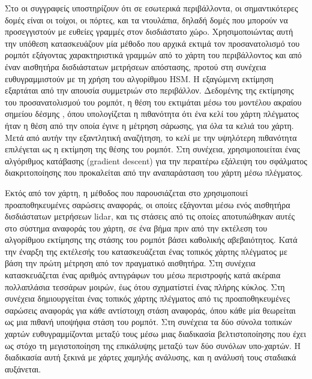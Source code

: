 Στο \cite{Zhu2011a} οι συγγραφείς υποστηρίζουν ότι σε εσωτερικά περιβάλλοντα,
οι σημαντικότερες δομές είναι οι τοίχοι, οι πόρτες, και τα ντουλάπια, δηλαδή
δομές που μπορούν να προσεγγιστούν με ευθείες γραμμές στον δισδιάστατο χώρo.
Χρησιμοποιώντας αυτή την υπόθεση κατασκευάζουν μία μέθοδο που αρχικά εκτιμά τον
προσανατολισμό του ρομπότ εξάγοντας χαρακτηριστικά γραμμών από το χάρτη του
περιβάλλοντος και από έναν αισθητήρα δισδιάστατων μετρήσεων απόστασης, προτού
στη συνέχεια ευθυγραμμιστούν με τη χρήση του αλγορίθμου HSM. Η εξαγώμενη
εκτίμηση εξαρτάται από την απουσία συμμετριών στο περιβάλλον. Δεδομένης της
εκτίμησης του προσανατολισμού του ρομπότ, η θέση του εκτιμάται μέσω του
μοντέλου ακραίου σημείου δέσμης \cite{thrun2005probabilistic}, όπου
υπολογίζεται η πιθανότητα ότι ένα κελί του χάρτη πλέγματος ήταν η θέση από την
οποία έγινε η μέτρηση σάρωσης, για όλα τα κελιά του χάρτη. Μετά από αυτήν την
εξαντλητική αναζήτηση, το κελί με την υψηλότερη πιθανότητα επιλέγεται ως η
εκτίμηση της θέσης του ρομπότ. Στη συνέχεια, χρησιμοποιείται ένας αλγόριθμος
κατάβασης (gradient descent) για την περαιτέρω εξάλειψη του σφάλματος
διακριτοποίησης που προκαλείται από την αναπαράσταση του χάρτη μέσω πλέγματος.

Εκτός από τον χάρτη, η μέθοδος που παρουσιάζεται στο \cite{Xie2010}
χρησιμοποιεί προαποθηκευμένες σαρώσεις αναφοράς, οι οποίες εξάγονται μέσω ενός
αισθητήρα δισδιάστατων μετρήσεων lidar, και τις στάσεις από τις οποίες
αποτυπώθηκαν αυτές στο σύστημα αναφοράς του χάρτη, σε ένα βήμα πριν από την
εκτέλεση του αλγορίθμου εκτίμησης της στάσης του ρομπότ βάσει καθολικής
αβεβαιότητος. Κατά την έναρξη της εκτέλεσής του κατασκευάζεται ένας τοπικός
χάρτης πλέγματος με βάση την πρώτη μέτρηση από τον πραγματικό αισθητήρα. Στη
συνέχεια κατασκευάζεται ένας αριθμός αντιγράφων του μέσω περιστροφής κατά
ακέραια πολλαπλάσια τεσσάρων μοιρών, έως ότου σχηματίστεί ένας πλήρης κύκλος.
Στη συνέχεια δημιουργείται ένας τοπικός χάρτης πλέγματος από τις
προαποθηκευμένες σαρώσεις αναφοράς για κάθε αντίστοιχη στάση αναφοράς, όπου
κάθε μία θεωρείται ως μια πιθανή υποψήφια στάση του ρομπότ. Στη συνέχεια τα δύο
σύνολα τοπικών χαρτών ευθυγραμμίζονται μεταξύ τους μέσω μιας διαδικασία
βελτιστοποίησης που έχει ως στόχο τη μεγιστοποίηση της επικάλυψης μεταξύ των
δύο συνόλων υπο-χαρτών. Η διαδικασία αυτή ξεκινά με χάρτες χαμηλής ανάλυσης,
και η ανάλυσή τους σταδιακά αυξάνεται.

